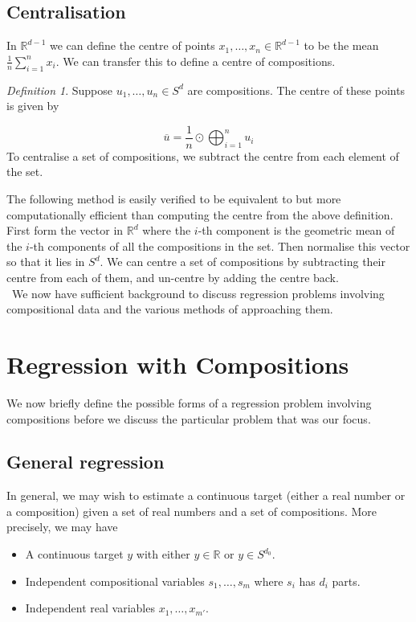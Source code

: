 \documentclass[BSc]{usydthesis}
\numberwithin{equation}{chapter}
\theoremstyle{remark}
\newtheorem{Definition}[equation]{Definition}
\begin{document}
\section{Centralisation}

In $\mathbb{R}^{d-1}$ we can define the centre of points $x_1,\ldots, x_n \in \mathbb{R}^{d-1}$ to be the mean $\frac{1}{n} \sum_{i=1}^n x_i.$ We can transfer this to define a centre of compositions.

\begin{Definition}
 Suppose $u_1, \ldots, u_n \in S^d$ are compositions. The centre of these points is given by 
 
$$ \overline{u} = \frac{1}{n} \odot \bigoplus_{i=1}^n u_i$$
To centralise a set of compositions, we subtract the centre from each element of the set. 
\end{Definition}

The following method is easily verified to be equivalent to but more computationally efficient than computing the centre from the above definition. First form the vector in $\mathbb{R}^d$ where the $i$-th component is the geometric mean of the $i$-th components of all the compositions in the set. Then normalise this vector so that it lies in $S^d.$ We can centre a set of compositions by subtracting their centre from each of them, and un-centre by adding the centre back. \\
\
We now have sufficient background to discuss regression problems involving compositional data and the various methods of approaching them.


\chapter{Regression with Compositions}

We now briefly define the possible forms of a regression problem involving compositions before we discuss the particular problem that was our focus. \\
\section{General regression}
In general, we may wish to estimate a continuous target (either a real number or a composition) given a set of real numbers and a set of compositions. More precisely, we may have 

\begin{itemize}
 \item A continuous target $y$ with either $y\in \mathbb{R}$ or $y\in S^{d_0}.$
 \item Independent compositional variables $s_1,\ldots, s_m$ where $s_i$ has $d_i$ parts.
 \item Independent real variables $x_1, \ldots, x_{m'}$.
\end{itemize}
 
\end{document}

